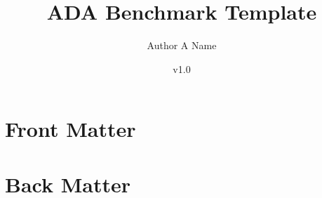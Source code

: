\documentclass[11pt]{book}
\title{ADA Benchmark Template}
\author{Author A Name}
\date{v1.0}
\begin{document}
\maketitle
\def\title#1{\chapter{#1}}
\tableofcontents

\part{Front Matter}
        
        
        
        
        
        
        
        
        
        
        
        
\part{Back Matter}
        
        


\printbibliography[title={Bibliography}]
\end{document}
